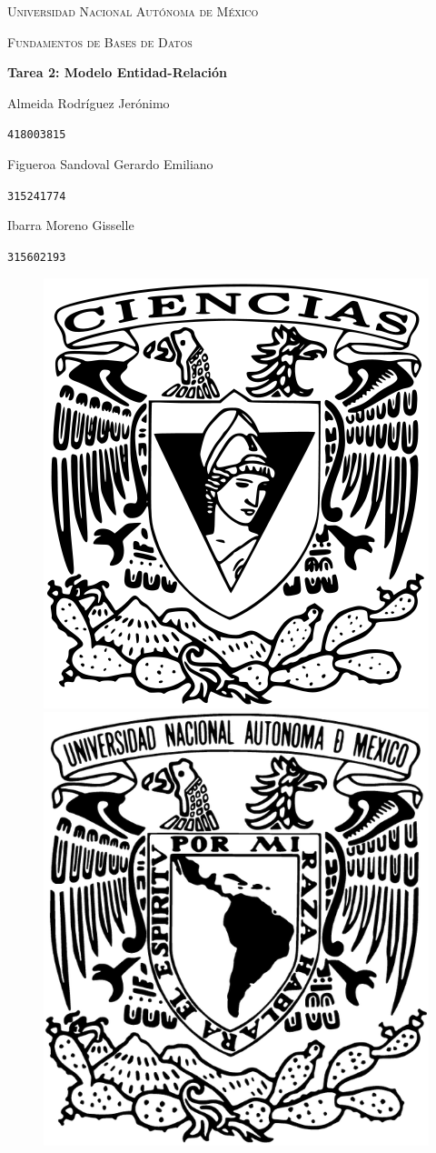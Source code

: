 \documentclass[a4paper, 12pt]{report}
\begin{document}
\begin{titlepage}
    \centering
    {\scshape\Huge Universidad Nacional Autónoma de México \par}
    \vspace{1.25cm}
    {\scshape\huge Fundamentos de Bases de Datos\par}
    \vspace{1.25cm}
    {\huge\bfseries Tarea 2: Modelo Entidad-Relación\par}
    \vspace{1.25cm}
    {\Large\textsc Almeida Rodríguez Jerónimo\par}
    \vspace{.1cm}
    {\large\texttt{418003815}\par}
    \vspace{0.25cm}
    {\Large\textsc Figueroa Sandoval Gerardo Emiliano\par}
    \vspace{.1cm}
    {\large\texttt{315241774}\par}
    \vspace{0.25cm}
    {\Large\textsc Ibarra Moreno Gisselle \par}
    \vspace{.1cm}
    {\large\texttt{315602193}\par}
    \vspace{1.5cm}
    \vfill
    \begin{figure}[hb!]
        \includegraphics[width=.3\textwidth]
            {../logos/escudo_f-ciencias.png}\hfill
        \includegraphics[width=.3\textwidth]
            {../logos/Escudo_UNAM.png}\hfill
    \end{figure}
\end{titlepage}
\end{document}

